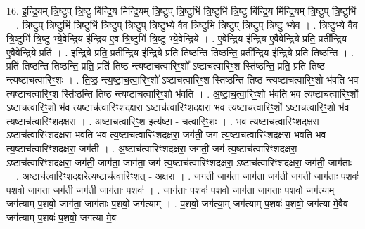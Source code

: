 \documentclass[17pt]{extarticle}
\begin{document}
16. इ॒न्द्रि॒यम् त्रि॒ष्टुप् त्रि॒ष्टु बि॑न्द्रि॒य मि॑न्द्रि॒यम् त्रि॒ष्टुप् त्रि॒ष्टुभि॑ त्रि॒ष्टुभि॑ त्रि॒ष्टु बि॑न्द्रि॒य मि॑न्द्रि॒यम् त्रि॒ष्टुप् त्रि॒ष्टुभि॑ । . त्रि॒ष्टुप् त्रि॒ष्टुभि॑ त्रि॒ष्टुभि॑ त्रि॒ष्टुप् त्रि॒ष्टुप् त्रि॒ष्टुभ्ये॒ वैव त्रि॒ष्टुभि॑ त्रि॒ष्टुप् त्रि॒ष्टुप् त्रि॒ष्टु भ्ये॒व । . त्रि॒ष्टुभ्ये॒ वैव त्रि॒ष्टुभि॑ त्रि॒ष्टु भ्ये॒वेन्द्रि॒य इ॑न्द्रि॒य ए॒व त्रि॒ष्टुभि॑ त्रि॒ष्टु भ्ये॒वेन्द्रि॒ये । . ए॒वेन्द्रि॒य इ॑न्द्रि॒य ए॒वैवेन्द्रि॒ये प्रति॒ प्रती᳚न्द्रि॒य ए॒वैवेन्द्रि॒ये प्रति॑ । . इ॒न्द्रि॒ये प्रति॒ प्रती᳚न्द्रि॒य इ॑न्द्रि॒ये प्रति॑ तिष्ठन्ति तिष्ठन्ति॒ प्रती᳚न्द्रि॒य इ॑न्द्रि॒ये प्रति॑ तिष्ठन्ति । . प्रति॑ तिष्ठन्ति तिष्ठन्ति॒ प्रति॒ प्रति॑ तिष्ठ न्त्यष्टाचत्वारिꣳ॒॒शो᳚ ऽष्टाचत्वारिꣳ॒॒श स्ति॑ष्ठन्ति॒ प्रति॒ प्रति॑ तिष्ठ न्त्यष्टाचत्वारिꣳ॒॒शः । . ति॒ष्ठ॒ न्त्य॒ष्टा॒च॒त्वा॒रिꣳ॒॒शो᳚ ऽष्टाचत्वारिꣳ॒॒श स्ति॑ष्ठन्ति तिष्ठ न्त्यष्टाचत्वारिꣳ॒॒शो भ॑वति भव त्यष्टाचत्वारिꣳ॒॒श स्ति॑ष्ठन्ति तिष्ठ न्त्यष्टाचत्वारिꣳ॒॒शो भ॑वति । . अ॒ष्टा॒च॒त्वा॒रिꣳ॒॒शो भ॑वति भव त्यष्टाचत्वारिꣳ॒॒शो᳚ ऽष्टाचत्वारिꣳ॒॒शो भ॑व त्य॒ष्टाच॑त्वारिꣳशदक्षरा॒ ऽष्टाच॑त्वारिꣳशदक्षरा भव त्यष्टाचत्वारिꣳ॒॒शो᳚ ऽष्टाचत्वारिꣳ॒॒शो भ॑व त्य॒ष्टाच॑त्वारिꣳशदक्षरा । . अ॒ष्टा॒च॒त्वा॒रिꣳ॒॒श इत्य॑ष्टा - च॒त्वा॒रिꣳ॒॒शः । . भ॒व॒ त्य॒ष्टाच॑त्वारिꣳशदक्षरा॒ ऽष्टाच॑त्वारिꣳशदक्षरा भवति भव त्य॒ष्टाच॑त्वारिꣳशदक्षरा॒ जग॑ती॒ जग॑ त्य॒ष्टाच॑त्वारिꣳशदक्षरा भवति भव त्य॒ष्टाच॑त्वारिꣳशदक्षरा॒ जग॑ती । . अ॒ष्टाच॑त्वारिꣳशदक्षरा॒ जग॑ती॒ जग॑ त्य॒ष्टाच॑त्वारिꣳशदक्षरा॒ ऽष्टाच॑त्वारिꣳशदक्षरा॒ जग॑ती॒ जाग॑ता॒ जाग॑ता॒ जग॑ त्य॒ष्टाच॑त्वारिꣳशदक्षरा॒ ऽष्टाच॑त्वारिꣳशदक्षरा॒ जग॑ती॒ जाग॑ताः । . अ॒ष्टाच॑त्वारिꣳशदक्ष॒रेत्य॒ष्टाच॑त्वारिꣳशत् - अ॒क्ष॒रा॒ । . जग॑ती॒ जाग॑ता॒ जाग॑ता॒ जग॑ती॒ जग॑ती॒ जाग॑ताः प॒शवः॑ प॒शवो॒ जाग॑ता॒ जग॑ती॒ जग॑ती॒ जाग॑ताः प॒शवः॑ । . जाग॑ताः प॒शवः॑ प॒शवो॒ जाग॑ता॒ जाग॑ताः प॒शवो॒ जग॑त्या॒म् जग॑त्याम् प॒शवो॒ जाग॑ता॒ जाग॑ताः प॒शवो॒ जग॑त्याम् । . प॒शवो॒ जग॑त्या॒म् जग॑त्याम् प॒शवः॑ प॒शवो॒ जग॑त्या मे॒वैव जग॑त्याम् प॒शवः॑ प॒शवो॒ जग॑त्या मे॒व । \newline
\end{document}
